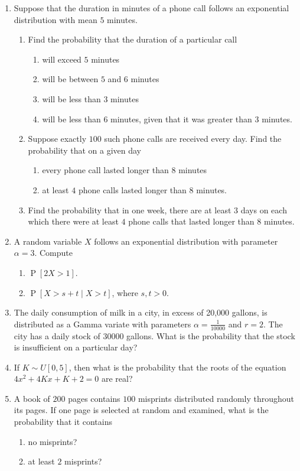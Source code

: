 \documentclass[svgnames]{amsart}
\DeclareMathOperator{\Prob}{P}
\begin{document}
\begin{enumerate}[leftmargin=*, itemsep=0.3em]
\item Suppose that the duration in minutes of a phone call follows an exponential distribution with mean $5$ minutes.
\begin{enumerate}
\item  Find the probability that the duration of a particular call
\begin{enumerate}
	\item will exceed $5$ minutes
	\item will be between $5$ and $6$ minutes
	\item will be less than $3$ minutes
	\item will be less than $6$ minutes, given that it was greater than $3$ minutes.
\end{enumerate}
\item Suppose exactly $100$ such phone calls are received every day. Find the probability that on a given day
\begin{enumerate}
	\item every phone call lasted longer than $8$ minutes
	\item at least $4$ phone calls lasted longer than $8$ minutes.
\end{enumerate}
\item Find the probability that in one week, there are at least $3$ days on each which there were at least $4$ phone calls that lasted longer than $8$ minutes.
\end{enumerate}

\item A random variable $X$ follows an exponential distribution with parameter $\alpha = 3$. Compute
\begin{enumerate}
	\item $\Prob[2X > 1]$.
	\item $\Prob[X > s + t \mid X > t]$, where $s, t > 0$.
\end{enumerate}

\item The daily consumption of milk in a city, in excess of 20,000 gallons, is distributed as a Gamma variate with parameters $\alpha = \frac 1 {10000}$ and $r = 2$. The city has a daily stock of $30000$ gallons. What is the probability that the stock is insufficient on a particular day?

\item If $K \sim U[0, 5]$, then what is the probability that the roots of the equation $4x^2 + 4Kx + K + 2 = 0$ are real?

\item A book of $200$ pages contains $100$ misprints distributed randomly throughout its pages. If one page is selected at random and examined, what is the probability that it contains
\begin{enumerate}
	\item no misprints?
	\item at least $2$ misprints?
\end{enumerate}


\end{enumerate}
\end{document}

